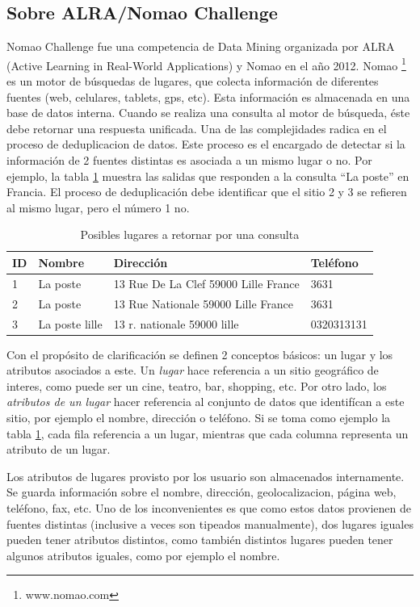 \documentclass[journal]{IEEEtran}
\begin{document}
\subsection{Sobre ALRA/Nomao Challenge}
Nomao Challenge fue una competencia de Data Mining organizada por ALRA 
(Active Learning in Real-World Applications) y Nomao en el año 2012. Nomao 
\footnote{www.nomao.com} es un motor de búsquedas de lugares, que colecta
información de diferentes fuentes (web, celulares, tablets, gps, 
etc). Esta información es almacenada en una base de datos interna. 
Cuando se realiza una consulta al motor de búsqueda, éste debe retornar una
respuesta unificada. Una de las complejidades
radica en el proceso de deduplicacion de datos. Este
proceso es el encargado de detectar si la información de 2 fuentes distintas
es asociada a un mismo lugar o no. Por ejemplo, la tabla \ref{table:example1}
muestra las salidas que responden a la consulta ``La poste'' en Francia. El
proceso de deduplicación debe identificar que el sitio 2 y 3 se refieren
al mismo lugar, pero el número 1 no.

\begin{table}[ht!]
\caption{Posibles lugares a retornar por una consulta}
\label{table:example1}
\centering
\begin{tabular}{l | l l l }
ID & Nombre & Dirección & Teléfono  \\
\hline
1 & La poste & 13 Rue De La Clef 59000 Lille France & 3631 \\ 
2 & La poste & 13 Rue Nationale 59000 Lille France & 3631 \\
3 & La poste lille & 13 r. nationale 59000 lille & 0320313131 \\
\end{tabular}
\end{table}

Con el propósito de clarificación se definen 2 conceptos básicos:
un lugar y los atributos asociados a este. Un \textit{lugar} hace referencia
a un sitio geográfico de interes, como puede ser un cine, teatro, bar, shopping, etc. 
Por otro lado, los \textit{atributos de un lugar} hacer referencia al conjunto de datos que 
identifícan a este sitio, por ejemplo el nombre, dirección o teléfono. 
Si se toma como ejemplo la tabla  \ref{table:example1}, 
cada fila  referencia a un lugar, 
mientras que cada columna representa un atributo de un lugar.

Los atributos de lugares  provisto por los usuario son almacenados internamente. 
Se guarda información sobre el nombre, dirección, geolocalizacion, página web,
teléfono, fax, etc. Uno de los inconvenientes es que como estos datos
provienen de fuentes distintas (inclusive a veces son tipeados manualmente),
dos lugares iguales pueden tener atributos distintos, como también
distintos lugares pueden tener algunos atributos iguales, como por 
ejemplo el nombre.
\end{document}
